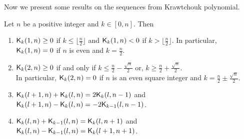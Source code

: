 \documentclass{llncs}
\begin{document}
Now we present some results on the sequences from Krawtchouk polynomial.
\begin{lemma}\label{lem:KProp}
Let $n$ be a positive integer and $k \in [0,n]$. Then
\begin{enumerate}
\item\label{itm:l1} $\mathsf{K}_{k}(1,n) \geq 0$ if $k \leq \lfloor\frac{n}{2}\rfloor$ and $\mathsf{K}_{k}(1,n) < 0$ if $k > \lfloor\frac{n}{2}\rfloor$.
In particular, $\mathsf{K}_{k}(1,n) = 0$ if $n$ is even and $k = \frac{n}{2}$.
\item \label{itm:l2} $\mathsf{K}_{k}(2,n) \geq 0$ if and only if $k \leq \frac{n}{2} - \frac{\sqrt{n}}{2}$ or, $k \geq \frac{n}{2} + \frac{\sqrt{n}}{2}$.\\
In particular, $\mathsf{K}_{k}(2,n) = 0$ if $n$ is an even square integer and $k = \frac{n}{2} \pm \frac{\sqrt{n}}{2}$.
\item\label{itm:ksd} $\mathsf{K}_{k}(l+1,n) + \mathsf{K}_{k}(l,n) = 2\mathsf{K}_{k}(l,n-1)$
and $\mathsf{K}_{k}(l+1,n) - \mathsf{K}_{k}(l,n) = -2\mathsf{K}_{k-1}(l,n-1)$.
\item \label{itm:ksd2} $\mathsf{K}_{k}(l,n) + \mathsf{K}_{k-1}(l,n) = \mathsf{K}_{k}(l,n+1)$ and $\mathsf{K}_{k}(l,n) - \mathsf{K}_{k-1}(l,n) = \mathsf{K}_{k}(l+1,n+1)$.
\end{enumerate}
\end{lemma}
\end{document}
